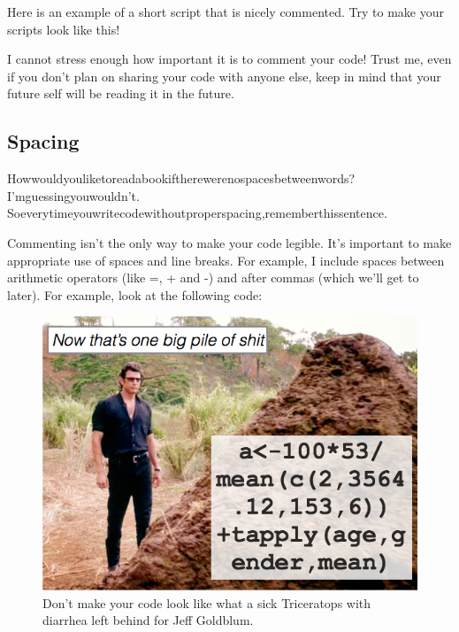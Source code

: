 \documentclass[
]{book}
\newenvironment{Shaded}{\begin{snugshade}}{\end{snugshade}}
\newcommand{\CommentTok}[1]{\textcolor[rgb]{0.56,0.35,0.01}{\textit{#1}}}
\newcommand{\DataTypeTok}[1]{\textcolor[rgb]{0.13,0.29,0.53}{#1}}
\newcommand{\KeywordTok}[1]{\textcolor[rgb]{0.13,0.29,0.53}{\textbf{#1}}}
\newcommand{\NormalTok}[1]{#1}
\newcommand{\OperatorTok}[1]{\textcolor[rgb]{0.81,0.36,0.00}{\textbf{#1}}}
\newcommand{\StringTok}[1]{\textcolor[rgb]{0.31,0.60,0.02}{#1}}
\begin{document}
Here is an example of a short script that is nicely commented. Try to make your scripts look like this!

\begin{Shaded}
\end{Shaded}

I cannot stress enough how important it is to comment your code! Trust me, even if you don't plan on sharing your code with anyone else, keep in mind that your future self will be reading it in the future.

\hypertarget{spacing}{%
\subsection{Spacing}\label{spacing}}

Howwouldyouliketoreadabookiftherewerenospacesbetweenwords?
I'mguessingyouwouldn't.
Soeverytimeyouwritecodewithoutproperspacing,rememberthissentence.

Commenting isn't the only way to make your code legible. It's important to make appropriate use of spaces and line breaks. For example, I include spaces between arithmetic operators (like =, + and -) and after commas (which we'll get to later). For example, look at the following code:

\begin{figure}

{\centering \includegraphics[width=0.5\linewidth]{images/pileofshit} 

}

\caption{Don't make your code look like what a sick Triceratops with diarrhea left behind for Jeff Goldblum.}\label{fig:pileofshit}
\end{figure}
\end{document}
